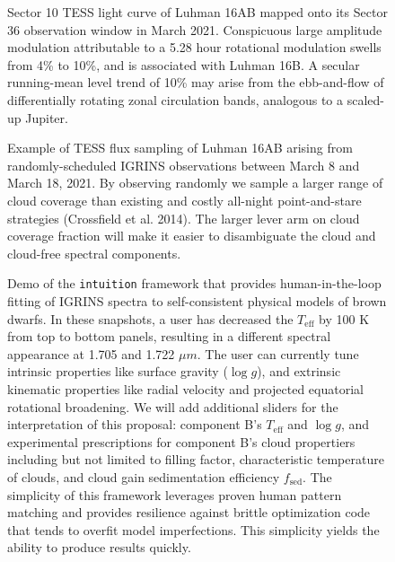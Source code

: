 \documentclass[11pt]{article}
\begin{document}
{\begin{figure}[ht!]
    \caption{Sector 10 TESS light curve of Luhman 16AB mapped onto its Sector 36 observation window in March 2021.  Conspicuous large amplitude modulation attributable to a 5.28 hour rotational modulation swells from 4\% to 10\%, and is associated with Luhman 16B.  A secular running-mean level trend of 10\% may arise from the ebb-and-flow of differentially rotating zonal circulation bands, analogous to a scaled-up Jupiter.}
\end{figure}

 
\begin{figure}[ht!]
    \caption{Example of TESS flux sampling of Luhman 16AB arising from randomly-scheduled IGRINS observations between March 8 and March 18, 2021.  By observing randomly we sample a larger range of cloud coverage than existing and costly all-night point-and-stare strategies (Crossfield et al. 2014).  The larger lever arm on cloud coverage fraction will make it easier to disambiguate the cloud and cloud-free spectral components.}
\end{figure}
    

 
\begin{figure}[ht!]

    \caption{Demo of the \texttt{intuition} framework that provides human-in-the-loop fitting of IGRINS spectra to self-consistent physical models of brown dwarfs.  In these snapshots, a user has decreased the $T_{\mathrm{eff}}$ by 100 K from top to bottom panels, resulting in a different spectral appearance at 1.705 and 1.722 $\mu m$.  The user can currently tune intrinsic properties like surface gravity ($\log{g}$), and extrinsic kinematic properties like radial velocity and projected equatorial rotational broadening.  We will add additional sliders for the interpretation of this proposal:  component B's $T_{\mathrm{eff}}$ and $\log{g}$, and experimental prescriptions for component B's cloud propertiers including but not limited to filling factor, characteristic temperature of clouds, and cloud gain sedimentation efficiency $f_{\mathrm{sed}}$.  The simplicity of this framework leverages proven human pattern matching and provides resilience against brittle optimization code that tends to overfit model imperfections.  This simplicity yields the ability to produce results quickly.  }
\end{figure}

}
\end{document}
